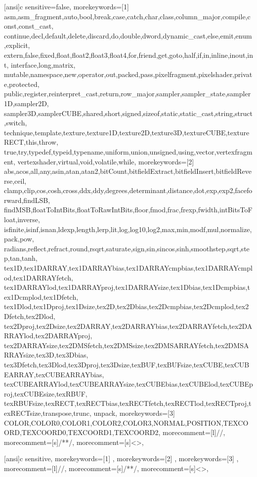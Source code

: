 
[ansi]{c}{%
  sensitive=false,
  morekeywords=[1]{%
    asm,asm_fragment,auto,bool,break,case,catch,char,class,column_major,compile,const,const_cast,
    continue,decl,default,delete,discard,do,double,dword,dynamic_cast,else,emit,enum,explicit,
    extern,false,fixed,float,float2,float3,float4,for,friend,get,goto,half,if,in,inline,inout,int,
    interface,long,matrix,
    mutable,namespace,new,operator,out,packed,pass,pixelfragment,pixelshader,private,protected,
    public,register,reinterpret_cast,return,row_major,sampler,sampler_state,sampler1D,sampler2D,
    sampler3D,samplerCUBE,shared,short,signed,sizeof,static,static_cast,string,struct,switch,
    technique,template,texture,texture1D,texture2D,texture3D,textureCUBE,textureRECT,this,throw,
    true,try,typedef,typeid,typename,uniform,union,unsigned,using,vector,vertexfragment,
    vertexshader,virtual,void,volatile,while},
  morekeywords=[2]{%
    abs,acos,all,any,asin,atan,atan2,bitCount,bitfieldExtract,bitfieldInsert,bitfieldReverse,ceil,
    clamp,clip,cos,cosh,cross,ddx,ddy,degrees,determinant,distance,dot,exp,exp2,faceforward,findLSB,
    findMSB,floatToIntBits,floatToRawIntBits,floor,fmod,frac,frexp,fwidth,intBitsToFloat,inverse,
    isfinite,isinf,isnan,ldexp,length,lerp,lit,log,log10,log2,max,min,modf,mul,normalize,pack,pow,
    radians,reflect,refract,round,rsqrt,saturate,sign,sin,sincos,sinh,smoothstep,sqrt,step,tan,tanh,
    tex1D,tex1DARRAY,tex1DARRAYbias,tex1DARRAYcmpbias,tex1DARRAYcmplod,tex1DARRAYfetch,
    tex1DARRAYlod,tex1DARRAYproj,tex1DARRAYsize,tex1Dbias,tex1Dcmpbias,tex1Dcmplod,tex1Dfetch,
    tex1Dlod,tex1Dproj,tex1Dsize,tex2D,tex2Dbias,tex2Dcmpbias,tex2Dcmplod,tex2Dfetch,tex2Dlod,
    tex2Dproj,tex2Dsize,tex2DARRAY,tex2DARRAYbias,tex2DARRAYfetch,tex2DARRAYlod,tex2DARRAYproj,
    tex2DARRAYsize,tex2DMSfetch,tex2DMSsize,tex2DMSARRAYfetch,tex2DMSARRAYsize,tex3D,tex3Dbias,
    tex3Dfetch,tex3Dlod,tex3Dproj,tex3Dsize,texBUF,texBUFsize,texCUBE,texCUBEARRAY,texCUBEARRAYbias,
    texCUBEARRAYlod,texCUBEARRAYsize,texCUBEbias,texCUBElod,texCUBEproj,texCUBEsize,texRBUF,
    texRBUFsize,texRECT,texRECTbias,texRECTfetch,texRECTlod,texRECTproj,texRECTsize,transpose,trunc,
    unpack},
  morekeywords=[3]{%
    COLOR,COLOR0,COLOR1,COLOR2,COLOR3,NORMAL,POSITION,TEXCOORD,TEXCOORD0,TEXCOORD1,TEXCOORD2},
  morecomment=[l]{//},
  morecomment=[s]{/*}{*/},
  morecomment=[s]{<}{>},
}

[ansi]{c}{%
  sensitive,
  morekeywords=[1]{%
  },
  morekeywords=[2]{%
  },
  morekeywords=[3]{%
  },
  morecomment=[l]{//},
  morecomment=[s]{/*}{*/},
  morecomment=[s]{<}{>},
}



